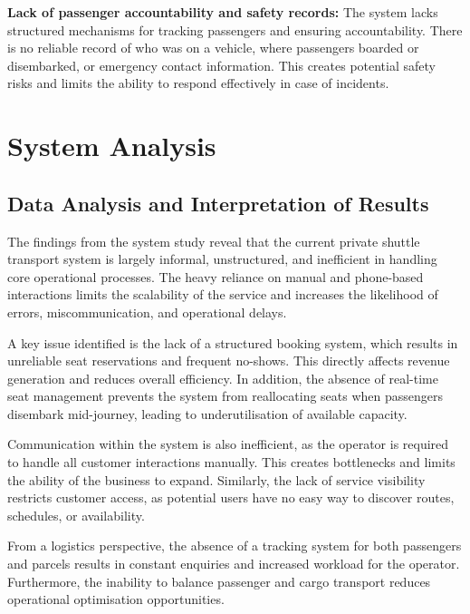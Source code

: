 \textbf{Lack of passenger accountability and safety records:} The
system lacks structured mechanisms for tracking passengers and ensuring
accountability. There is no reliable record of who was on a vehicle, where
passengers boarded or disembarked, or emergency contact information. This
creates potential safety risks and limits the ability to respond effectively in
case of incidents.

\section{System Analysis}

\subsection{Data Analysis and Interpretation of Results}

The findings from the system study reveal that the current private shuttle
transport system is largely informal, unstructured, and inefficient in handling
core operational processes. The heavy reliance on manual and phone-based
interactions limits the scalability of the service and increases the likelihood
of errors, miscommunication, and operational delays.



A key issue identified is the lack of a structured booking system, which results
in unreliable seat reservations and frequent no-shows. This directly affects
revenue generation and reduces overall efficiency. In addition, the absence of
real-time seat management prevents the system from reallocating seats when
passengers disembark mid-journey, leading to underutilisation of available
capacity.



Communication within the system is also inefficient, as the operator is required
to handle all customer interactions manually. This creates bottlenecks and
limits the ability of the business to expand. Similarly, the lack of service
visibility restricts customer access, as potential users have no easy way to
discover routes, schedules, or availability.



From a logistics perspective, the absence of a tracking system for both
passengers and parcels results in constant enquiries and increased workload for
the operator. Furthermore, the inability to balance passenger and cargo
transport reduces operational optimisation opportunities.



